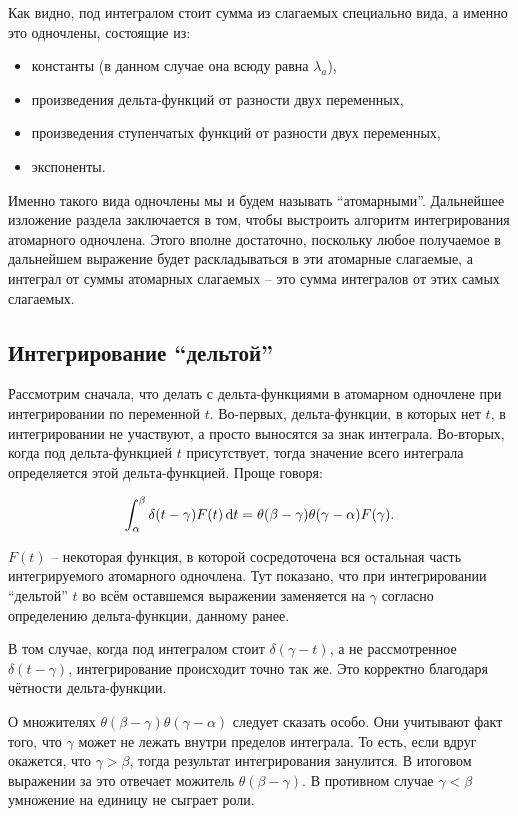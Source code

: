 \documentclass[a4paper, 12pt]{article}
\begin{document}
Как видно, под интегралом стоит сумма из слагаемых специально вида, а именно это одночлены, состоящие из:
\begin{itemize}
\item константы (в данном случае она всюду равна $\lambda_a$),
\item произведения дельта-функций от разности двух переменных,
\item произведения ступенчатых функций от разности двух переменных,
\item экспоненты.
\end{itemize}
Именно такого вида одночлены мы и будем называть ``атомарными''. Дальнейшее изложение раздела заключается в том, чтобы выстроить алгоритм интегрирования атомарного одночлена. Этого вполне достаточно, поскольку любое получаемое в дальнейшем выражение будет раскладываться в эти атомарные слагаемые, а интеграл от суммы атомарных слагаемых -- это сумма интегралов от этих самых слагаемых.

\subsection{Интегрирование ``дельтой''}

Рассмотрим сначала, что делать с дельта-функциями в атомарном одночлене при интегрировании по переменной $t$. Во-первых, дельта-функции, в которых нет $t$, в интегрировании не участвуют, а просто выносятся за знак интеграла. Во-вторых, когда под дельта-функцией $t$ присутствует, тогда значение всего интеграла определяется этой дельта-функцией. Проще говоря:

\begin{equation}
  \label{eq:int1}
  \int_{\alpha}^{\beta} \delta(t - \gamma) F(t) \dif t
  = \theta(\beta - \gamma) \theta(\gamma - \alpha) F(\gamma).
\end{equation}

$F(t)$ -- некоторая функция, в которой сосредоточена вся остальная часть интегрируемого атомарного одночлена. Тут показано, что при интегрировании ``дельтой'' $t$ во всём оставшемся выражении заменяется на $\gamma$ согласно определению дельта-функции, данному ранее.

В том случае, когда под интегралом стоит $\delta(\gamma - t)$, а не рассмотренное $\delta(t - \gamma)$, интегрирование происходит точно так же. Это корректно благодаря чётности дельта-функции.

О множителях $\theta(\beta - \gamma) \theta(\gamma - \alpha)$ следует сказать особо. Они учитывают факт того, что $\gamma$ может не лежать внутри пределов интеграла. То есть, если вдруг окажется, что $\gamma > \beta$, тогда результат интегрирования занулится. В итоговом выражении за это отвечает можитель $\theta(\beta - \gamma)$. В противном случае $\gamma < \beta$ умножение на единицу не сыграет роли.
\end{document}
